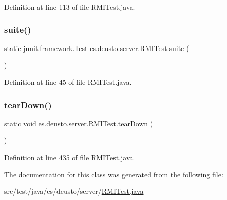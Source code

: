 Definition at line 113 of file R\+M\+I\+Test.\+java.

\mbox{\label{classes_1_1deusto_1_1server_1_1_r_m_i_test_aa7e6688b24d65fd77edadd24a4c93c97}} 
\subsubsection{\texorpdfstring{suite()}{suite()}}
{\footnotesize\ttfamily static junit.\+framework.\+Test es.\+deusto.\+server.\+R\+M\+I\+Test.\+suite (\begin{DoxyParamCaption}{ }\end{DoxyParamCaption})\hspace{0.3cm}{\ttfamily [static]}}



Definition at line 45 of file R\+M\+I\+Test.\+java.

\mbox{\label{classes_1_1deusto_1_1server_1_1_r_m_i_test_a069a29652068120e6807a325863d09aa}} 
\subsubsection{\texorpdfstring{tear\+Down()}{tearDown()}}
{\footnotesize\ttfamily static void es.\+deusto.\+server.\+R\+M\+I\+Test.\+tear\+Down (\begin{DoxyParamCaption}{ }\end{DoxyParamCaption})\hspace{0.3cm}{\ttfamily [static]}}



Definition at line 435 of file R\+M\+I\+Test.\+java.



The documentation for this class was generated from the following file\+:\begin{DoxyCompactItemize}
\item 
src/test/java/es/deusto/server/\hyperlink{_r_m_i_test_8java}{R\+M\+I\+Test.\+java}\end{DoxyCompactItemize}
